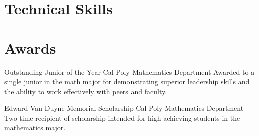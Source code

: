 \documentclass[a4paper, 11pt, sans]{moderncv}
\begin{document}

\section{Technical Skills}


\section{Awards}
        {Outstanding Junior of the Year}
        {Cal Poly Mathematics Department}{}{}
        {Awarded to a single junior in the math major for demonstrating superior leadership skills and the ability to work effectively with peers and faculty.\newline}

        {Edward Van Duyne Memorial Scholarship}
        {Cal Poly Mathematics Department}{}{}
        {Two time recipient of scholarship intended for high-achieving students in the mathematics major.\newline}
\end{document}
